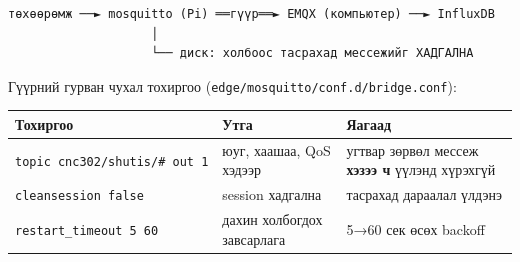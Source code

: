 \begin{verbatim}
төхөөрөмж ──► mosquitto (Pi) ══гүүр══► EMQX (компьютер) ──► InfluxDB
                    │
                    └── диск: холбоос тасрахад мессежийг ХАДГАЛНА
\end{verbatim}

Гүүрний гурван чухал тохиргоо (\texttt{edge/\allowbreak{}mosquitto/\allowbreak{}conf.\allowbreak{}d/\allowbreak{}bridge.\allowbreak{}conf}):

\begingroup\scriptsize\begin{longtable}[]{@{}lll@{}}
\toprule
\begin{minipage}[b]{0.30\columnwidth}\raggedright
Тохиргоо\strut
\end{minipage} & \begin{minipage}[b]{0.30\columnwidth}\raggedright
Утга\strut
\end{minipage} & \begin{minipage}[b]{0.30\columnwidth}\raggedright
Яагаад\strut
\end{minipage}\tabularnewline
\midrule
\endhead
\begin{minipage}[t]{0.30\columnwidth}\raggedright
\texttt{topic\ cnc302/\allowbreak{}shutis/\allowbreak{}\#\ out\ 1}\strut
\end{minipage} & \begin{minipage}[t]{0.30\columnwidth}\raggedright
юуг, хаашаа, QoS хэдээр\strut
\end{minipage} & \begin{minipage}[t]{0.30\columnwidth}\raggedright
угтвар зөрвөл мессеж \textbf{хэзээ ч} үүлэнд хүрэхгүй\strut
\end{minipage}\tabularnewline
\begin{minipage}[t]{0.30\columnwidth}\raggedright
\texttt{cleansession\ false}\strut
\end{minipage} & \begin{minipage}[t]{0.30\columnwidth}\raggedright
session хадгална\strut
\end{minipage} & \begin{minipage}[t]{0.30\columnwidth}\raggedright
тасрахад дараалал үлдэнэ\strut
\end{minipage}\tabularnewline
\begin{minipage}[t]{0.30\columnwidth}\raggedright
\texttt{restart\_\allowbreak{}timeout\ 5\ 60}\strut
\end{minipage} & \begin{minipage}[t]{0.30\columnwidth}\raggedright
дахин холбогдох завсарлага\strut
\end{minipage} & \begin{minipage}[t]{0.30\columnwidth}\raggedright
5→60 сек өсөх backoff\strut
\end{minipage}\tabularnewline
\bottomrule
\end{longtable}\endgroup


